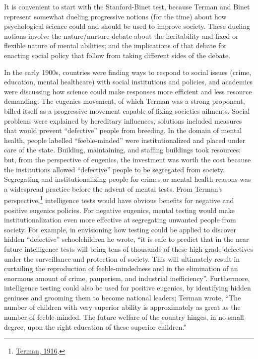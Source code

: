 \documentclass[
  oneside,
  12pt]{crumpbook}
\begin{document}
It is convenient to start with the Stanford-Binet test, because Terman and Binet represent somewhat dueling progressive notions (for the time) about how psychological science could and should be used to improve society. These dueling notions involve the nature/nurture debate about the heritability and fixed or flexible nature of mental abilities; and the implications of that debate for enacting social policy that follow from taking different sides of the debate.

In the early 1900s, countries were finding ways to respond to social issues (crime, education, mental healthcare) with social institutions and policies, and academics were discussing how science could make responses more efficient and less resource demanding. The eugenics movement, of which Terman was a strong proponent, billed itself as a progressive movement capable of fixing societies ailments. Social problems were explained by hereditary influences, solutions included measures that would prevent ``defective'' people from breeding. In the domain of mental health, people labelled ``feeble-minded'' were institutionalized and placed under care of the state. Building, maintaining, and staffing buildings took resources; but, from the perspective of eugenics, the investment was worth the cost because the institutions allowed ``defective'' people to be segregated from society. Segregating and institutionalizing people for crimes or mental health reasons was a widespread practice before the advent of mental tests. From Terman's perspective,\footnote{\protect\hyperlink{ref-termanMeasurementIntelligenceExplanation1916}{Terman, 1916}.} intelligence tests would have obvious benefits for negative and positive eugenics policies. For negative eugenics, mental testing would make institutionalization even more effective at segregating unwanted people from society. For example, in envisioning how testing could be applied to discover hidden ``defective'' schoolchildren he wrote, ``it is safe to predict that in the near future intelligence tests will bring tens of thousands of these high-grade defectives under the surveillance and protection of society. This will ultimately result in curtailing the reproduction of feeble-mindedness and in the elimination of an enormous amount of crime, pauperism, and industrial inefficiency''. Furthermore, intelligence testing could also be used for positive eugenics, by identifying hidden geniuses and grooming them to become national leaders; Terman wrote, ``The number of children with very superior ability is approximately as great as the number of feeble-minded. The future welfare of the country hinges, in no small degree, upon the right education of these superior children.''
\end{document}
